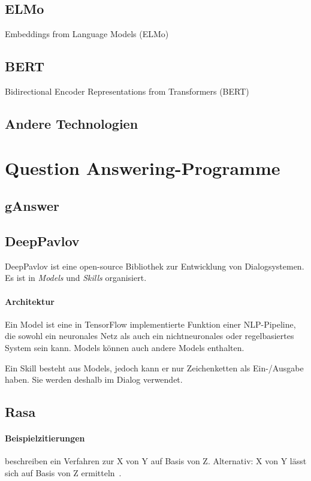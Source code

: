 \subsection{ELMo}

Embeddings from Language Models (ELMo)

\subsection{BERT}

Bidirectional Encoder Representations from Transformers (BERT)

\subsection{Andere Technologien}

\section{Question Answering-Programme}

\subsection{gAnswer}
\subsection{DeepPavlov}
DeepPavlov ist eine open-source Bibliothek zur Entwicklung von Dialogsystemen.
Es ist in \emph{Models} und \emph{Skills} organisiert.

\paragraph{Architektur}
Ein Model ist eine in TensorFlow implementierte Funktion einer NLP-Pipeline,
die sowohl ein neuronales Netz als auch ein nichtneuronales oder regelbasiertes System sein kann.
Models können auch andere Models enthalten.

Ein Skill besteht aus Models, jedoch kann er nur Zeichenketten als Ein-/Ausgabe haben.
Sie werden deshalb im Dialog verwendet.

\subsection{Rasa}


\paragraph{Beispielzitierungen}
\citet{sniktec} beschreiben ein Verfahren zur X von Y auf Basis von Z.
Alternativ: X von Y lässt sich auf Basis von Z ermitteln~\citep{sniktec}.
